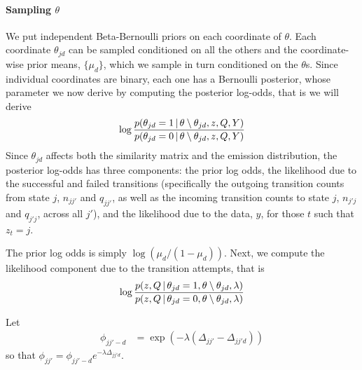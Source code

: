 \paragraph{Sampling $\theta$} We put independent Beta-Bernoulli priors
on each coordinate of $\theta$.  Each coordinate $\theta_{jd}$ can be sampled
conditioned on all the others and the coordinate-wise prior means,
$\{\mu_d\}$, which we sample in turn conditioned on the $\theta$s.  Since individual coordinates are binary, each one has a Bernoulli posterior, whose parameter we now derive by computing the posterior log-odds, that is we will derive
\begin{equation}
  \label{eq:1}
  \log \frac{p(\theta_{jd} = 1 \, \vert \, \theta\setminus\theta_{jd}, z, Q, Y)}{p(\theta_{jd} = 0 \, \vert \, \theta\setminus\theta_{jd}, z, Q, Y)}
\end{equation}
Since $\theta_{jd}$ affects both the similarity matrix and the emission distribution, the posterior log-odds has three components: 
the prior log odds, the likelihood due to the successful and failed transitions (specifically the outgoing transition counts from state $j$, $n_{jj'}$ and $q_{jj'}$, as well as the incoming transition counts to state $j$, $n_{j'j}$ and $q_{j'j}$, across all $j'$), 
and the likelihood due to the data, $y$, for those $t$ such that $z_{t} = j$.

The prior log odds is simply $\log(\mu_d / (1 - \mu_d))$.  Next, we compute the likelihood component due to the transition attempts, that is
\begin{equation*}
  \log \frac{p(z, Q \, \vert \, \theta_{jd} = 1, \theta\setminus\theta_{jd}, \lambda)}{p(z, Q \, \vert \, \theta_{jd} = 0, \theta\setminus\theta_{jd}, \lambda)}
\end{equation*}

Let
\begin{align}
  \label{eq:68}
  \phi_{jj'-d} &= \exp(-\lambda(\Delta_{jj'} - \Delta_{jj'd}))
\end{align}
so that $\phi_{jj'} = \phi_{jj'-d} e^{-\lambda\Delta_{jj'd}}$.

